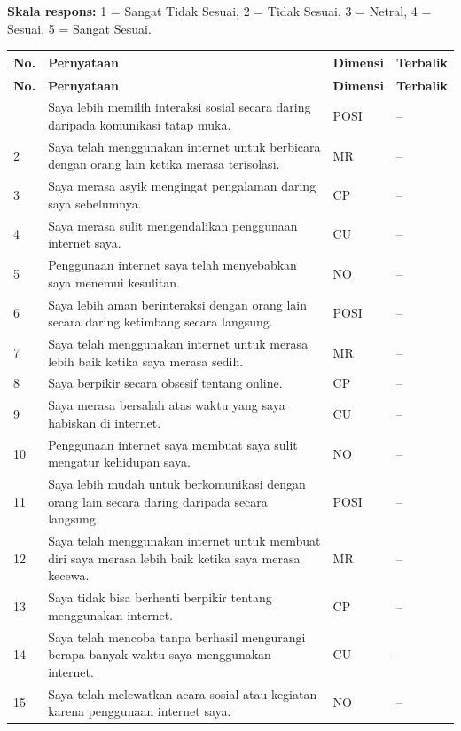 \noindent\textbf{Skala respons:} 1 = Sangat Tidak Sesuai, 2 = Tidak Sesuai, 3 = Netral, 4 = Sesuai, 5 = Sangat Sesuai.

{\footnotesize
\renewcommand{\arraystretch}{1.3}
\begin{longtable}{|p{0.7cm}|p{7.5cm}|p{2.4cm}|p{1.4cm}|}
\hline
\textbf{No.} & \textbf{Pernyataan} & \textbf{Dimensi} & \textbf{Terbalik} \\
\hline
\endfirsthead
\hline
\textbf{No.} & \textbf{Pernyataan} & \textbf{Dimensi} & \textbf{Terbalik} \\
\hline
\endhead
\hline
\endfoot
1 & Saya lebih memilih interaksi sosial secara daring daripada komunikasi tatap muka. & POSI & -- \\
\hline
2 & Saya telah menggunakan internet untuk berbicara dengan orang lain ketika merasa terisolasi. & MR & -- \\
\hline
3 & Saya merasa asyik mengingat pengalaman daring saya sebelumnya. & CP & -- \\
\hline
4 & Saya merasa sulit mengendalikan penggunaan internet saya. & CU & -- \\
\hline
5 & Penggunaan internet saya telah menyebabkan saya menemui kesulitan. & NO & -- \\
\hline
6 & Saya lebih aman berinteraksi dengan orang lain secara daring ketimbang secara langsung. & POSI & -- \\
\hline
7 & Saya telah menggunakan internet untuk merasa lebih baik ketika saya merasa sedih. & MR & -- \\
\hline
8 & Saya berpikir secara obsesif tentang online. & CP & -- \\
\hline
9 & Saya merasa bersalah atas waktu yang saya habiskan di internet. & CU & -- \\
\hline
10 & Penggunaan internet saya membuat saya sulit mengatur kehidupan saya. & NO & -- \\
\hline
11 & Saya lebih mudah untuk berkomunikasi dengan orang lain secara daring daripada secara langsung. & POSI & -- \\
\hline
12 & Saya telah menggunakan internet untuk membuat diri saya merasa lebih baik ketika saya merasa kecewa. & MR & -- \\
\hline
13 & Saya tidak bisa berhenti berpikir tentang menggunakan internet. & CP & -- \\
\hline
14 & Saya telah mencoba tanpa berhasil mengurangi berapa banyak waktu saya menggunakan internet. & CU & -- \\
\hline
15 & Saya telah melewatkan acara sosial atau kegiatan karena penggunaan internet saya. & NO & -- \\
\hline
\end{longtable}
}
\clearpage

